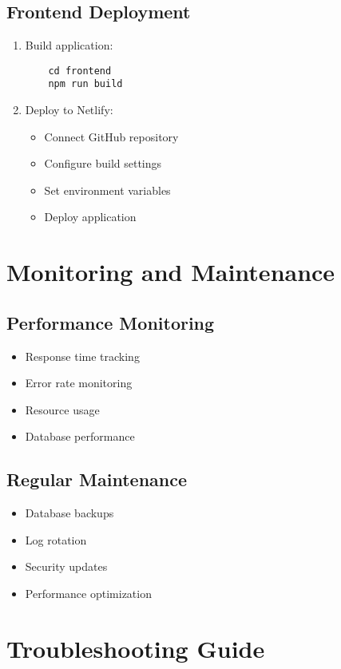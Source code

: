 \subsection{Frontend Deployment}
\begin{enumerate}
    \item Build application:
    \begin{verbatim}
    cd frontend
    npm run build
    \end{verbatim}
    
    \item Deploy to Netlify:
    \begin{itemize}
        \item Connect GitHub repository
        \item Configure build settings
        \item Set environment variables
        \item Deploy application
    \end{itemize}
\end{enumerate}

\section{Monitoring and Maintenance}
\subsection{Performance Monitoring}
\begin{itemize}
    \item Response time tracking
    \item Error rate monitoring
    \item Resource usage
    \item Database performance
\end{itemize}

\subsection{Regular Maintenance}
\begin{itemize}
    \item Database backups
    \item Log rotation
    \item Security updates
    \item Performance optimization
\end{itemize}

\section{Troubleshooting Guide}
